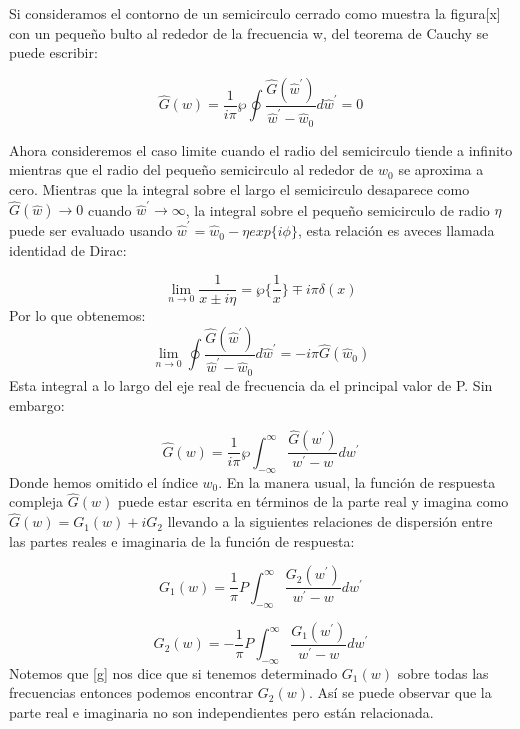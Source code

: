 \documentclass[a4paper,openright,12pt]{book}
\begin{document}
Si consideramos el contorno de un semicirculo cerrado como muestra la figura[x] con un pequeño bulto al rededor de la frecuencia w, del teorema de Cauchy se puede escribir:

\begin{equation}
\hat{G}(w)=\frac{1}{i\pi}\wp\oint \frac{\hat{G}(\hat{w}^{'})}{\hat{w}^{'}-\hat{w}_{0}}d\hat{w}^{'}=0
\end{equation}

Ahora consideremos el caso limite cuando el radio del semicirculo tiende a infinito mientras que el radio del pequeño semicirculo al rededor de $w_{0}$ se aproxima a cero. Mientras que la integral sobre el largo el semicirculo desaparece como $\hat{G}(\hat{w})\rightarrow 0$ cuando $\hat{w}^{'}\rightarrow\infty$, la integral sobre el pequeño semicirculo de radio $\eta$ puede ser evaluado usando $\hat{w}^{'}=\hat{w}_{0}-\eta exp\{i\phi \}$, esta relación es aveces llamada identidad de Dirac: 

\begin{equation}
\lim_{n\rightarrow 0}\frac{1}{x \pm i\eta}=\wp\{\frac{1}{x}\} 	\mp i\pi \delta(x)
\end{equation}
Por lo que obtenemos:
\begin{equation}
\lim_{n\rightarrow 0}\oint \frac{\hat{G}(\hat{w}^{'})}{\hat{w}^{'}-\hat{w}_{0}}d\hat{w}^{'}=-i\pi \hat{G}(\hat{w}_{0})
\end{equation}
Esta integral a lo largo del eje real de frecuencia da el principal valor de P. Sin embargo:

\begin{equation}
\hat{G}(w)=\frac{1}{i\pi}\wp\int_{-\infty}^{\infty}\frac{\hat{G}(w^{'})}{w^{'}-w}dw^{'}
\end{equation}
Donde hemos omitido el índice $w_{0}$. En la manera usual, la función de respuesta compleja $\hat{G}(w)$ puede estar escrita en términos de la parte real y imagina como $\hat{G}(w)=G_{1}(w)+iG_{2}$ llevando a la siguientes relaciones de dispersión entre las partes reales e imaginaria de la función de respuesta:

\begin{equation}
G_{1}(w)=\frac{1}{\pi}P\int_{-\infty}^{\infty}\frac{G_{2}(w^{'})}{w^{'}-w}dw^{'}
\end{equation}

\begin{equation}\label{g}
G_{2}(w)=-\frac{1}{\pi}P\int_{-\infty}^{\infty}\frac{G_{1}(w^{'})}{w^{'}-w}dw^{'}
\end{equation}
Notemos que \ref{g} nos dice que si tenemos determinado $G_{1}(w)$ sobre todas las frecuencias entonces podemos encontrar $G_{2}(w)$. Así se puede observar que la parte real e imaginaria no son independientes pero están relacionada.
\end{document}
